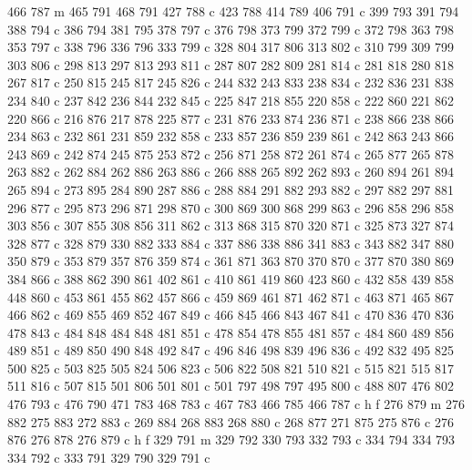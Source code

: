 {{        466 787 m
        465 791 468 791 427 788 c
        423 788 414 789 406 791 c
        399 793 391 794 388 794 c
        386 794 381 795 378 797 c
        376 798 373 799 372 799 c
        372 798 363 798 353 797 c
        338 796 336 796 333 799 c
        328 804 317 806 313 802 c
        310 799 309 799 303 806 c
        298 813 297 813 293 811 c
        287 807 282 809 281 814 c
        281 818 280 818 267 817 c
        250 815 245 817 245 826 c
        244 832 243 833 238 834 c
        232 836 231 838 234 840 c
        237 842 236 844 232 845 c
        225 847 218 855 220 858 c
        222 860 221 862 220 866 c
        216 876 217 878 225 877 c
        231 876 233 874 236 871 c
        238 866 238 866 234 863 c
        232 861 231 859 232 858 c
        233 857 236 859 239 861 c
        242 863 243 866 243 869 c
        242 874 245 875 253 872 c
        256 871 258 872 261 874 c
        265 877 265 878 263 882 c
        262 884 262 886 263 886 c
        266 888 265 892 262 893 c
        260 894 261 894 265 894 c
        273 895 284 890 287 886 c
        288 884 291 882 293 882 c
        297 882 297 881 296 877 c
        295 873 296 871 298 870 c
        300 869 300 868 299 863 c
        296 858 296 858 303 856 c
        307 855 308 856 311 862 c
        313 868 315 870 320 871 c
        325 873 327 874 328 877 c
        328 879 330 882 333 884 c
        337 886 338 886 341 883 c
        343 882 347 880 350 879 c
        353 879 357 876 359 874 c
        361 871 363 870 370 870 c
        377 870 380 869 384 866 c
        388 862 390 861 402 861 c
        410 861 419 860 423 860 c
        432 858 439 858 448 860 c
        453 861 455 862 457 866 c
        459 869 461 871 462 871 c
        463 871 465 867 466 862 c
        469 855 469 852 467 849 c
        466 845 466 843 467 841 c
        470 836 470 836 478 843 c
        484 848 484 848 481 851 c
        478 854 478 855 481 857 c
        484 860 489 856 489 851 c
        489 850 490 848 492 847 c
        496 846 498 839 496 836 c
        492 832 495 825 500 825 c
        503 825 505 824 506 823 c
        506 822 508 821 510 821 c
        515 821 515 817 511 816 c
        507 815 501 806 501 801 c
        501 797 498 797 495 800 c
        488 807 476 802 476 793 c
        476 790 471 783 468 783 c
        467 783 466 785 466 787 c
        h f
        276 879 m
        276 882 275 883 272 883 c
        269 884 268 883 268 880 c
        268 877 271 875 275 876 c
        276 876 276 878 276 879 c
        h f
        329 791 m
        329 792 330 793 332 793 c
        334 794 334 793 334 792 c
        333 791 329 790 329 791 c
}}

